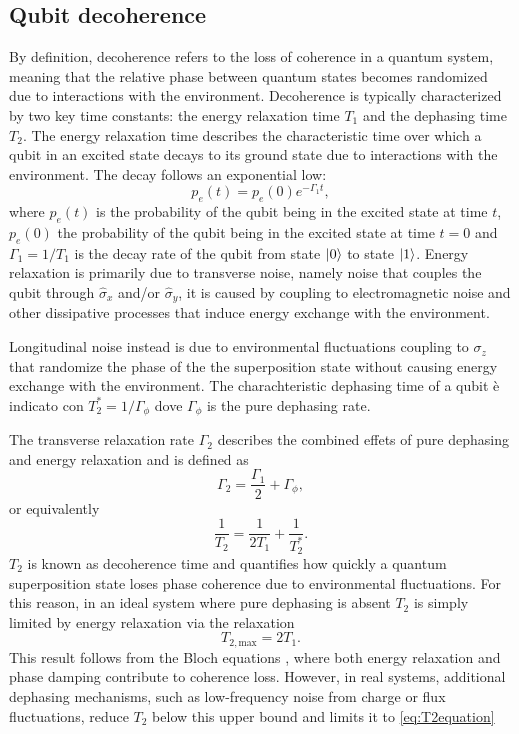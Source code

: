 \subsection{Qubit decoherence}\label{subsec:qubit_decoherence}
By definition, decoherence refers to the loss of coherence in a quantum system, meaning that the relative phase between quantum states becomes randomized due to interactions with the environment. 
Decoherence is typically characterized by two key time constants: the energy relaxation time $T_1$ and the dephasing time $T_2$. 
The energy relaxation time  describes the characteristic time over which a qubit in an excited state decays to its ground state due to interactions with the environment. The decay follows an exponential low:
\begin{equation}\label{eq:gamma1}
    p_e(t) = p_e(0) e^{-\Gamma_1 t},
\end{equation}
where $p_e(t)$ is the probability of the qubit being in the excited state at time $t$, $p_e(0)$ the probability of the qubit being in the excited state at time $t=0$ and $\Gamma_1=1/T_1$ is the decay rate of the qubit from state $\ket{0}$ to state $\ket{1}$.
Energy relaxation is primarily due to transverse noise, namely noise that couples the qubit through $\hat{\sigma}_x$ and/or $\hat{\sigma}_y$, it is caused by coupling to electromagnetic noise and other dissipative processes that induce energy exchange with the environment.

Longitudinal noise instead is due to environmental fluctuations coupling to $\sigma_z$ that randomize the phase of the the superposition state without causing energy exchange with the environment.
The charachteristic dephasing time of a qubit è indicato con $T_2^* = 1/\Gamma_\phi$ dove $\Gamma_\phi$ is the pure dephasing rate.

The transverse relaxation rate $\Gamma_2$ describes the combined effets of pure dephasing and energy relaxation and is defined as 
\begin{equation}\label{eq:gamma2}
    \Gamma_2 = \frac{\Gamma_1}{2} + \Gamma_\phi,
\end{equation}
or equivalently
\begin{equation}\label{eq:T2equation}
    \frac{1}{T_2} = \frac{1}{2T_1} + \frac{1}{T_2^*}.
\end{equation}
$T_2$ is known as decoherence time and quantifies how quickly a quantum superposition state loses phase coherence due to environmental fluctuations. 
For this reason, in an ideal system where pure dephasing is absent $T_2$ is simply limited by energy relaxation via the relaxation\begin{equation}\label{eq:T2max}
    T_{2,\text{max}} = 2T_1.
\end{equation}
This result follows from the Bloch equations \cite{krantz_quantum_2019}, where both energy relaxation and phase damping contribute to coherence loss. 
However, in real systems, additional dephasing mechanisms, such as low-frequency noise from charge or flux fluctuations, reduce $T_2$ below this upper bound and limits it to \ref{eq:T2equation}

